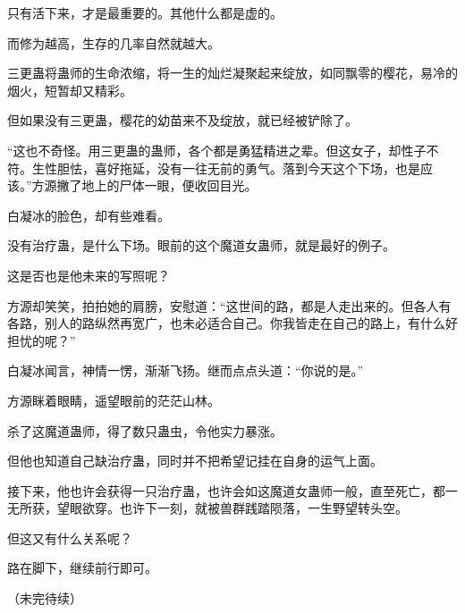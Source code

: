 \begin{this_body}
只有活下来，才是最重要的。其他什么都是虚的。

而修为越高，生存的几率自然就越大。

三更蛊将蛊师的生命浓缩，将一生的灿烂凝聚起来绽放，如同飘零的樱花，易冷的烟火，短暂却又精彩。

但如果没有三更蛊，樱花的幼苗来不及绽放，就已经被铲除了。

“这也不奇怪。用三更蛊的蛊师，各个都是勇猛精进之辈。但这女子，却性子不符。生性胆怯，喜好拖延，没有一往无前的勇气。落到今天这个下场，也是应该。”方源撇了地上的尸体一眼，便收回目光。

白凝冰的脸色，却有些难看。

没有治疗蛊，是什么下场。眼前的这个魔道女蛊师，就是最好的例子。

这是否也是他未来的写照呢？

方源却笑笑，拍拍她的肩膀，安慰道：“这世间的路，都是人走出来的。但各人有各路，别人的路纵然再宽广，也未必适合自己。你我皆走在自己的路上，有什么好担忧的呢？”

白凝冰闻言，神情一愣，渐渐飞扬。继而点点头道：“你说的是。”

方源眯着眼睛，遥望眼前的茫茫山林。

杀了这魔道蛊师，得了数只蛊虫，令他实力暴涨。

但他也知道自己缺治疗蛊，同时并不把希望记挂在自身的运气上面。

接下来，他也许会获得一只治疗蛊，也许会如这魔道女蛊师一般，直至死亡，都一无所获，望眼欲穿。也许下一刻，就被兽群践踏陨落，一生野望转头空。

但这又有什么关系呢？

路在脚下，继续前行即可。

（未完待续）

\end{this_body}

